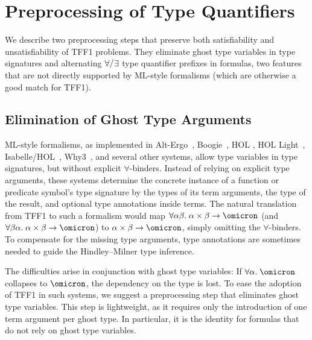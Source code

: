 \section{Preprocessing of Type Quantifiers}
\label{sec_preproc}

We describe two preprocessing steps that preserve both satisfiability and
unsatisfiability of TFF1 problems. They eliminate ghost type variables in type
signatures and alternating $\forall\raise.15ex\hbox{\ensuremath{\slash}}\vthinspace\exists$ type quantifier prefixes in
formulas, two features that are not directly supported by ML-style formalisms
(which are otherwise a good match for TFF1).

\subsection{Elimination of Ghost Type Arguments} \label{ssec:ghost}

ML-style formalisms, as implemented in Alt-Ergo~\cite{bobot-et-al-2008},
Boogie~\cite{leino-ruemmer-2010}, HOL \cite{gordon-melham-1993}, HOL
Light~\cite{harrison-1996}, Isabelle\slash HOL~\cite{nipkow-et-al-2002},
Why3~\cite{bobot-et-al-2011}, and several other systems, allow type variables
in type signatures, but without explicit $\forall$-binders.
Instead of relying on explicit type arguments, these systems determine the
concrete instance of a function or predicate symbol's type signature by the
types of its term arguments, the type of the result, and optional type
annotations inside terms.
%
The natural translation from TFF1 to such a formalism would map $\forall
\alpha\beta.\; \alpha\times\beta\to\omicron$ (and $\forall \beta\alpha.\;
\alpha\times\beta\to\omicron$) to $\alpha\times\beta\to\omicron$, simply
omitting the $\forall$-binders. To compensate for the missing type arguments,
type annotations are sometimes needed to guide the Hindley--Milner type
inference.

The difficulties arise in conjunction with ghost type variables: If
$\forall\alpha.\;\omicron$ collapses to $\omicron$, the dependency on the type
is lost.
%
To ease the adoption of TFF1 in such systems, we suggest a preprocessing step
that eliminates ghost type variables. This step is lightweight, as it requires
only the introduction of one term argument per ghost type. In particular,
it is the identity for formulas that do not rely on ghost type variables.


